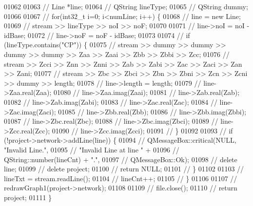 \begin{DoxyCode}
01062 
01063 \textcolor{comment}{//  Line *line;}
01064 \textcolor{comment}{//  QString lineType;}
01065 \textcolor{comment}{//  QString dummy;}
01066 
01067 \textcolor{comment}{//  for(int32\_t i=0; i<numLine; i++) \{}
01068 \textcolor{comment}{//    line = new Line;}
01069 \textcolor{comment}{//    stream >> lineType >> noI >> noF;}
01070 
01071 \textcolor{comment}{//    line->noI = noI - idBase;}
01072 \textcolor{comment}{//    line->noF = noF - idBase;}
01073 
01074 \textcolor{comment}{//    if (lineType.contains("CP")) \{}
01075 \textcolor{comment}{//      stream >> dummy >> dummy >> dummy >> dummy >> Zaa >> Zaai >> Zbb >> Zbbi >> Zcc;}
01076 \textcolor{comment}{//      stream >> Zcci >> Znn >> Znni >> Zab >> Zabi >> Zac >> Zaci >> Zan >> Zani;}
01077 \textcolor{comment}{//      stream >> Zbc >> Zbci >> Zbn >> Zbni >> Zcn >> Zcni >> dummy >> length;}
01078 \textcolor{comment}{//      line->length = length;}
01079 \textcolor{comment}{//      line->Zaa.real(Zaa);}
01080 \textcolor{comment}{//      line->Zaa.imag(Zaai);}
01081 \textcolor{comment}{//      line->Zab.real(Zab);}
01082 \textcolor{comment}{//      line->Zab.imag(Zabi);}
01083 \textcolor{comment}{//      line->Zac.real(Zac);}
01084 \textcolor{comment}{//      line->Zac.imag(Zaci);}
01085 \textcolor{comment}{//      line->Zbb.real(Zbb);}
01086 \textcolor{comment}{//      line->Zbb.imag(Zbbi);}
01087 \textcolor{comment}{//      line->Zbc.real(Zbc);}
01088 \textcolor{comment}{//      line->Zbc.imag(Zbci);}
01089 \textcolor{comment}{//      line->Zcc.real(Zcc);}
01090 \textcolor{comment}{//      line->Zcc.imag(Zcci);}
01091 \textcolor{comment}{//    \}}
01092 
01093 \textcolor{comment}{//    if (!project->network->addLine(line)) \{}
01094 \textcolor{comment}{//      QMessageBox::critical(NULL, "Invalid Line.",}
01095 \textcolor{comment}{//                            "Invalid Line at line " +}
01096 \textcolor{comment}{//                            QString::number(lineCnt) + ".",}
01097 \textcolor{comment}{//                            QMessageBox::Ok);}
01098 \textcolor{comment}{//      delete line;}
01099 \textcolor{comment}{//      delete project;}
01100 \textcolor{comment}{//      return NULL;}
01101 \textcolor{comment}{//    \}}
01102 
01103 \textcolor{comment}{//    lineTxt = stream.readLine();}
01104 \textcolor{comment}{//    lineCnt++;}
01105 \textcolor{comment}{//  \}}
01106 
01107 \textcolor{comment}{//  redrawGraph1(project->network);}
01108 
01109 \textcolor{comment}{//  file.close();}
01110 \textcolor{comment}{//  return project;}
01111 \}
\end{DoxyCode}
